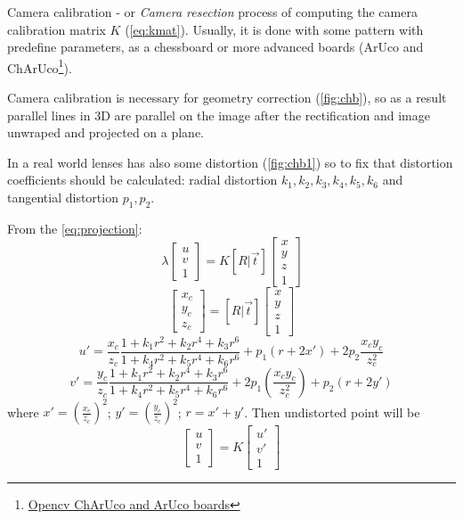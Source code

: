 Camera calibration - or \textit{Camera resection} process of computing the camera calibration matrix $K$ (\autoref{eq:kmat}).
Usually, it is done with some pattern with predefine parameters, as a chessboard or more advanced boards (ArUco and ChArUco\footnote{\href{https://docs.opencv.org/4.x/df/d4a/tutorial_charuco_detection.html}{Opencv ChArUco and ArUco boards}}).

Camera calibration is necessary for geometry correction (\autoref{fig:chb}), so as a result parallel lines in 3D are parallel on the image after the rectification and image unwraped and projected on a plane.

In a real world lenses has also some distortion (\autoref{fig:chb1}) so to fix that distortion coefficients should be calculated: radial distortion $k_1, k_2, k_3, k_4, k_5, k_6$ and tangential distortion $p_1, p_2$.

From the \autoref{eq:projection}:
\begin{equation}
    \label{eq:dist_start}
    \lambda \begin{bmatrix} 
        u \\ v \\ 1 \end{bmatrix} = K [R | \vec{t}] \begin{bmatrix} x \\ y \\ z \\ 1
    \end{bmatrix}
\end{equation}
\begin{equation}
    \begin{bmatrix} x_c \\ y_c \\ z_c \end{bmatrix}
     = [R | \vec{t}] \begin{bmatrix} x \\ y \\ z \\ 1
    \end{bmatrix}
\end{equation}
\begin{equation}
    u' = \frac{x_c}{z_c} \frac{1 + k_1r^2 + k_2r^4 + k_3r^6}{1 + k_4r^2 + k_5r^4 + k_6r^6} + p_1(r + 2x') + 2p_2\frac{x_c y_c}{z^2_c}
\end{equation}
\begin{equation}
    v' = \frac{y_c}{z_c} \frac{1 + k_1r^2 + k_2r^4 + k_3r^6}{1 + k_4r^2 + k_5r^4 + k_6r^6} + 2p_1(\frac{x_c y_c}{z_c^2}) + p_2(r + 2y')
\end{equation}
where $x' = (\frac{x_c}{z_c})^2$; $y' = (\frac{y_c}{z_c})^2$; $r = x' + y'$. Then undistorted point will be
\begin{equation}
    \label{eq:dist_end}
    \begin{bmatrix} u \\ v \\ 1 \end{bmatrix} = K \begin{bmatrix} u' \\ v' \\ 1 \end{bmatrix}
\end{equation}

